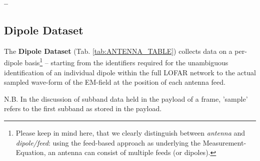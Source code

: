 \documentclass[a4paper,10pt,bibtotoc]{scrartcl}
\begin{document}
\begin{list}{\textbf{--}}{}
\end{list}


\subsection{Dipole Dataset}
\label{sec:dipole dataset}

The \textbf{Dipole Dataset} (Tab. \ref{tab:ANTENNA_TABLE}) collects data on
a per-dipole basis\footnote{Please keep in mind here, that we clearly
  distinguish between \textsl{antenna} and \textsl{dipole/feed}: using the
  feed-based approach as underlying the Measurement-Equation, an antenna can
  consist of multiple feeds (or dipoles).} -- starting from the identifiers
required for the unambiguous identification of an individual dipole within
the full LOFAR network to the actual sampled wave-form of the EM-field at the
position of each antenna feed.

N.B. In the discussion of subband data held in the payload of a frame, 'sample'
refers to the first subband as stored in the payload.
\end{document}
